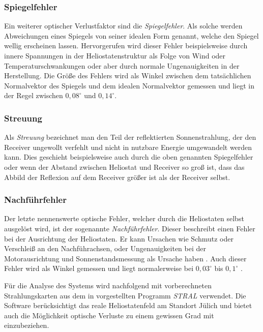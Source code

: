 \subsubsection*{Spiegelfehler} \label{subsubsec_Spiegelfehler}
Ein weiterer optischer Verlustfaktor sind die \textit{Spiegelfehler}.
Als solche werden Abweichungen eines Spiegels von seiner idealen Form genannt, welche den Spiegel wellig erscheinen lassen.
Hervorgerufen wird dieser Fehler beispielsweise durch innere Spannungen in der Heliostatenstruktur als Folge von Wind oder Temperaturschwankungen oder aber durch normale Ungenauigkeiten in der Herstellung.
Die Größe des Fehlers wird als Winkel zwischen dem tatsächlichen Normalvektor des Spiegels und dem idealen Normalvektor gemessen und liegt in der Regel zwischen $0,08^\circ$ und $0,14^\circ$. \cite[S.16]{DissBelhomme}

\subsubsection*{Streuung} \label{subsubsec_Streuung}
Als \textit{Streuung} bezeichnet man den Teil der reflektierten Sonnenstrahlung, der den Receiver ungewollt verfehlt und nicht in nutzbare Energie umgewandelt werden kann.
Dies geschieht beispielsweise auch durch die oben genannten Spiegelfehler oder wenn der Abstand zwischen Heliostat und Receiver so groß ist, dass das Abbild der Reflexion auf dem Receiver größer ist als der Receiver selbst. \cite[S.15-16]{DissBelhomme}

\subsubsection*{Nachführfehler} \label{subsubsec_Nachführfehler}
Der letzte nennenswerte optische Fehler, welcher durch die Heliostaten selbst ausgelöst wird, ist der sogenannte \textit{Nachführfehler}.
Dieser beschreibt einen Fehler bei der Ausrichtung der Heliostaten.
Er kann Ursachen wie Schmutz oder Verschleiß an den Nachführachsen, oder Ungenauigkeiten bei der Motorausrichtung und Sonnenstandsmessung als Ursache haben \cite[S.7]{Richter}. Auch dieser Fehler wird als Winkel gemessen und liegt normalerweise bei $0,03^\circ$ bis $0,1^\circ$ \cite[S.17]{DissBelhomme}.

Für die Analyse des Systems wird nachfolgend mit vorberechneten Strahlungskarten aus dem in \cite[S.53ff]{DissBelhomme} vorgestellten Programm \textit{STRAL} verwendet.
Die Software berücksichtigt das reale Heliostatenfeld am Standort Jülich und bietet auch die Möglichkeit optische Verluste zu einem gewissen Grad mit einzubeziehen.


